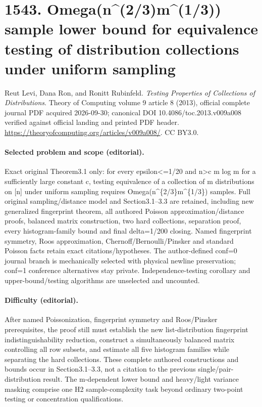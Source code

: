 \documentclass[10pt]{article}
\theoremstyle{definition}
\numberwithin{equation}{section}
\begin{document}
\section*{1543. Omega(n\textasciicircum{}(2/3)m\textasciicircum{}(1/3)) sample lower bound for equivalence testing of distribution collections under uniform sampling}
Reut Levi, Dana Ron, and Ronitt Rubinfeld. \emph{Testing Properties of Collections of Distributions}. Theory of Computing volume 9 article 8 (2013), official complete journal PDF acquired 2026-09-30; canonical DOI 10.4086/toc.2013.v009a008 verified against official landing and printed PDF header. \url{https://theoryofcomputing.org/articles/v009a008/}. CC BY3.0.
\paragraph{Selected problem and scope (editorial).} Exact original Theorem3.1 only: for every epsilon<=1/20 and n>c m log m for a sufficiently large constant c, testing equivalence of a collection of m distributions on [n] under uniform sampling requires Omega(n\textasciicircum{}\{2/3\}m\textasciicircum{}\{1/3\}) samples. Full original sampling/distance model and Section3.1–3.3 are retained, including new generalized fingerprint theorem, all authored Poisson approximation/distance proofs, balanced matrix construction, two hard collections, separation proof, every histogram-family bound and final delta=1/200 closing. Named fingerprint symmetry, Roos approximation, Chernoff/Bernoulli/Pinsker and standard Poisson facts retain exact citations/hypotheses. The author-defined conf=0 journal branch is mechanically selected with physical newline preservation; conf=1 conference alternatives stay private. Independence-testing corollary and upper-bound/testing algorithms are unselected and uncounted.
\paragraph{Difficulty (editorial).} After named Poissonization, fingerprint symmetry and Roos/Pinsker prerequisites, the proof still must establish the new list-distribution fingerprint indistinguishability reduction, construct a simultaneously balanced matrix controlling all row subsets, and estimate all five histogram families while separating the hard collections. These complete authored constructions and bounds occur in Section3.1–3.3, not a citation to the previous single/pair-distribution result. The m-dependent lower bound and heavy/light variance masking comprise one H2 sample-complexity task beyond ordinary two-point testing or concentration qualifications.
\end{document}

